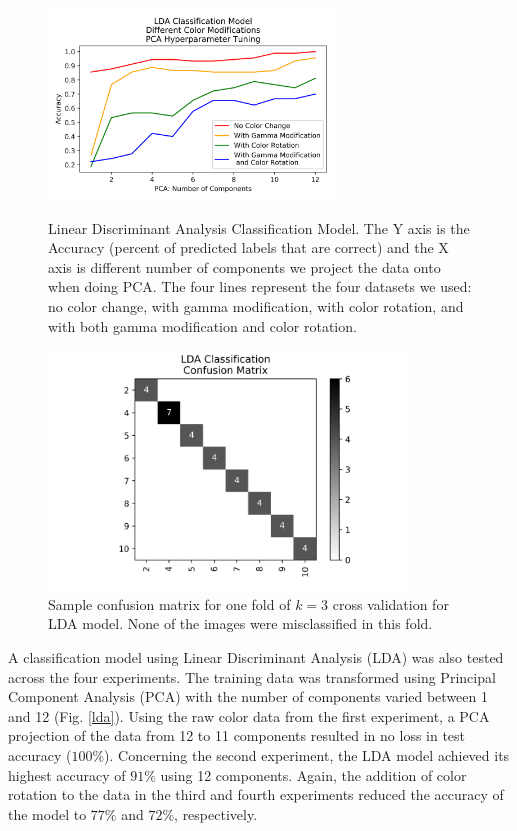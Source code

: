 \documentclass[journal]{IEEEtran}
\begin{document}
\begin{figure}
\centering
\includegraphics[height=2in]{LDA/lda_classification.png}
\caption{Linear Discriminant Analysis Classification Model. The Y axis is the Accuracy (percent of predicted labels that are correct) and the X axis is different number of components we project the data onto when doing PCA. The four lines represent the four datasets we used: no color change, with gamma modification, with color rotation, and with both gamma modification and color rotation.}
\label{lda}

\centering
\includegraphics[height=2.5in]{LDA/LDA_classification_cfm.png}
\caption{Sample confusion matrix for one fold of $k=3$ cross validation for LDA model. None of the images were misclassified in this fold.}
\label{lda_confusion}
\end{figure}

A classification model using Linear Discriminant Analysis (LDA) was also tested across the four experiments. The training data was transformed using Principal Component Analysis (PCA) with the number of components varied between 1 and 12 (Fig. \ref{lda}). Using the raw color data from the first experiment, a PCA projection of the data from 12 to 11 components resulted in no loss in test accuracy ($100\%$). Concerning the second experiment, the LDA model achieved its highest accuracy of $91\%$ using 12 components. Again, the addition of color rotation to the data in the third and fourth experiments reduced the accuracy of the model to $77\%$ and $72\%$, respectively.
\end{document}

